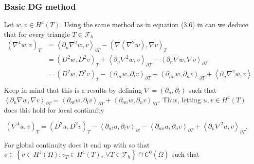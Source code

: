 \subsubsection{Basic DG method}%
\label{ssub:basic_dg_method}
Let $w,v \in  H^{4} \left( T  \right) $. Using the same method as in equation (3.6) in  \cite{gu2012c0} can we
deduce that for every triangle $T \in  \mathcal{F}_{h} $ \[
    \begin{split}
        \left( \nabla ^{4} w, v \right) _{T} &= \left< \partial _{n} \nabla ^2 w, v \right>_{\partial T} - \left( \nabla \left( \nabla ^2 w
 \right), \nabla  v  \right)_{T}   \\
 &= \left( D^2w, D^2v \right)_{T} + \left< \partial _{n} \nabla ^2 w, v \right>_{\partial T}  - \left<\partial _{n}
 \nabla w, \nabla v \right>_{\partial T} \\
 &=  \left( D^2 w, D^2 v \right)_{T} - \left<\partial _{nt} w, \partial _{t} v \right>_{\partial T} - \left<\partial
 _{nn} w, \partial _{n} v \right> _{\partial T} +  \left<\partial _{n} \nabla ^2 w, v \right> \\
    \end{split}
\]
Keep in mind that this is a results by defining $\nabla  = \left( \partial _{n}, \partial _{t} \right) $ such that
$\left<\partial _{n} \nabla w, \nabla v \right>_{\partial T} = \left<\partial _{nt} w, \partial _{t} v\right> _{\partial
T} + \left< \partial _{nn} w, \partial _{n} v  \right> _{\partial T} $. Thus, letting $u,v \in
H^{4}\left( T  \right) $  does this hold for local continuity

\begin{equation}
\label{eq:bi_basic_dg}
\left( \nabla ^{4} u,v \right) _{T} = \left( D^2u,D^2v \right) _{T } - \left<\partial _{nt} u, \partial _{t}v
\right>_{\partial t} - \left<\partial _{nn} u, \partial _{n}v \right>_{\partial T} + \left<\partial _{n} \nabla ^2 u,v
\right>_{\partial T}
.\end{equation}

For global continuity does it end up with  so that $v \in \left\{ v \in H^{1}\left( \Omega  \right): v_{T} \in  H^{4}\left( T \right), \ \forall T \in
\mathcal{T}_{h}    \right\}   \cap C^{0} (
\overline{\Omega }  ) $ such that

